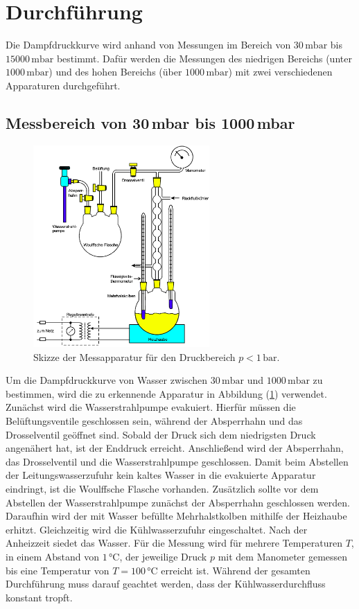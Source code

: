\section{Durchführung}
\label{sec:Durchführung}
Die Dampfdruckkurve wird anhand von Messungen im Bereich von $30\,\unit{\milli\bar}$ bis $15000\, \unit{\milli\bar}$ bestimmt.
Dafür werden die Messungen des niedrigen Bereichs (unter $1000\, \unit{\milli\bar}$) und des hohen Bereichs (über $1000\, \unit{\milli\bar}$)
mit zwei verschiedenen Apparaturen durchgeführt.
\subsection{Messbereich von 30\,mbar bis 1000\,mbar}
\label{sec:ErsteDurchführung}
\begin{figure}[H]
    \centering
    \includegraphics[width=0.60\textwidth]{Erste_Apparatur.png}
    \caption{Skizze der Messapparatur für den Druckbereich $p<1\,\unit{\bar}$. \cite{anleitungV203}}
    \label{fig:ErsteApparatur}
\end{figure}
Um die Dampfdruckkurve von Wasser zwischen $30\,\unit{\milli\bar}$ und $1000\,\unit{\milli\bar}$ zu bestimmen, wird die zu erkennende Apparatur in Abbildung
(\ref{fig:ErsteApparatur}) verwendet. Zunächst wird die Wasserstrahlpumpe evakuiert. Hierfür müssen die Belüftungsventile geschlossen sein, während der Absperrhahn
und das Drosselventil geöffnet sind. Sobald der Druck sich dem niedrigsten Druck angenähert hat, ist der Enddruck erreicht.  
Anschließend wird der Absperrhahn, das Drosselventil und die Wasserstrahlpumpe geschlossen. Damit beim Abstellen der Leitungswasserzufuhr kein kaltes Wasser in die
evakuierte Apparatur eindringt, ist die Woulffsche Flasche vorhanden. Zusätzlich sollte vor dem Abstellen der Wasserstrahlpumpe zunächst der Absperrhahn geschlossen werden.
Daraufhin wird der mit Wasser befüllte Mehrhalstkolben mithilfe der Heizhaube erhitzt. Gleichzeitig wird die Kühlwasserzufuhr eingeschaltet. Nach der Anheizzeit siedet das Wasser.
Für die Messung wird für mehrere Temperaturen $T$, in einem Abstand von $1\,\unit{\celsius}$, der jeweilige Druck $p$ mit dem Manometer gemessen bis eine Temperatur von $T= 100\,\unit{\celsius}$ erreicht ist.
Während der gesamten Durchführung muss darauf geachtet werden, dass der Kühlwasserdurchfluss konstant tropft.
